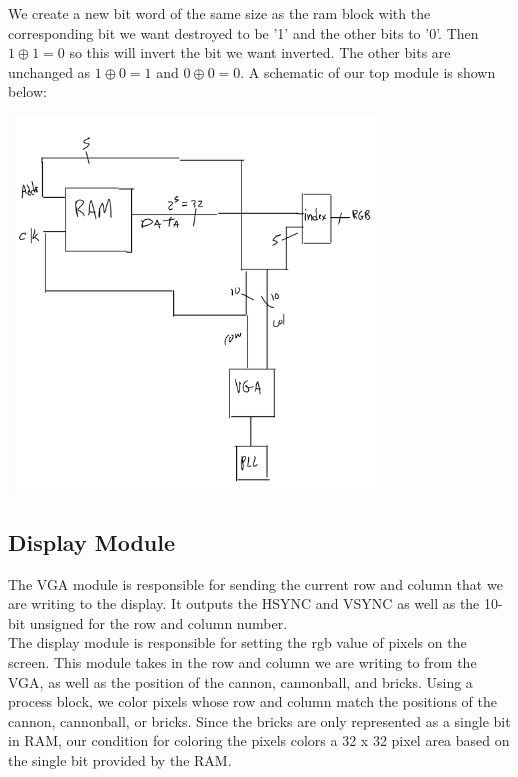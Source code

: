 \documentclass[12pt]{article}
\begin{document}
\begin{flushleft}
We create a new bit word of the same size as the ram block  with the corresponding bit we want destroyed to be '1'
and the other bits to '0'. Then $ 1 \oplus 1 = 0$ so this will invert the bit we
want inverted. The other bits are unchanged as $1 \oplus 0 = 1$ and $0 \oplus 0 = 0$.  
A schematic of our top module is shown below:\\
\begin{center}
\includegraphics[width=10cm, height=10cm]{displayDiagram}
\end{center}
\subsection{Display Module}
The VGA module is responsible for sending the current row and column that we are
writing to the display. It outputs the HSYNC and VSYNC as well as the 10-bit
unsigned for the row and column number.\\ 
\hfill \break
The display module is responsible for setting the rgb value of pixels on the
screen. This module takes in the row and column we are writing to from the VGA,
as well as the position of the cannon, cannonball, and bricks. Using a process
block, we color pixels whose row and column match the positions of the cannon,
cannonball, or bricks. Since the bricks are only represented as a single bit in
RAM, our condition for coloring the pixels colors a 32 x 32 pixel area based on
the single bit provided by the RAM.


\end{flushleft}
\end{document}
